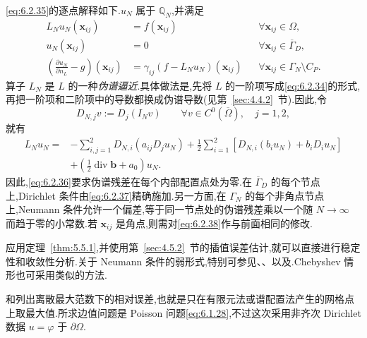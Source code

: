 \eqref{eq:6.2.35}的逐点解释如下.\(u_N\) 属于 \(\mathbb Q_N\),并满足
\begin{align}
  L_Nu_N(\boldsymbol{x}_{ij})&=f(\boldsymbol{x}_{ij})
     &&\forall\boldsymbol{x}_{ij}\in\Omega,\label{eq:6.2.36}\\
  u_N(\boldsymbol{x}_{ij})&=0
     &&\forall\boldsymbol{x}_{ij}\in\overline\Gamma_D,\label{eq:6.2.37}\\
  \left(\frac{\partial u_N}{\partial n_L}-g\right)(\boldsymbol{x}_{ij})
     &=\gamma_{ij}(f-L_Nu_N)(\boldsymbol{x}_{ij})
     &&\forall\boldsymbol{x}_{ij}\in\Gamma_N\setminus C_P.\label{eq:6.2.38}
\end{align}
算子 \(L_N\) 是 \(L\) 的一种\emph{伪谱逼近}.具体做法是,先将 \(L\) 的一阶项写成\eqref{eq:6.2.34}的形式,再把一阶项和二阶项中的导数都换成伪谱导数(见第~\ref{sec:4.4.2}~节).因此,令
\begin{equation}\label{eq:6.2.39}
  D_{N,j}v:=D_j(I_Nv)
    \qquad\forall v\in C^0(\overline\Omega),\quad j=1,2,
\end{equation}
就有
\begin{equation}\label{eq:6.2.40}
  \begin{aligned}
    L_Nu_N={}&-\sum_{i,j=1}^2D_{N,i}(a_{ij}D_ju_N)
       +\frac12\sum_{i=1}^2[D_{N,i}(b_i u_N)+b_iD_i u_N]\\
      &+\left(\frac12\operatorname{div}\boldsymbol{b}+a_0\right)u_N.
  \end{aligned}
\end{equation}
因此,\eqref{eq:6.2.36}要求伪谱残差在每个内部配置点处为零.在 \(\overline\Gamma_D\) 的每个节点上,Dirichlet 条件由\eqref{eq:6.2.37}精确施加.另一方面,在 \(\Gamma_N\) 的每个非角点节点上,Neumann 条件允许一个偏差,等于同一节点处的伪谱残差乘以一个随 \(N\to\infty\) 而趋于零的小常数.若 \(\boldsymbol{x}_{ij}\) 是角点,则需对\eqref{eq:6.2.38}作与前面相同的修改.

应用定理~\ref{thm:5.5.1},并使用第~\ref{sec:4.5.2}~节的插值误差估计,就可以直接进行稳定性和收敛性分析.关于 Neumann 条件的弱形式,特别可参见、、以及.Chebyshev 情形也可采用类似的方法.

和列出离散最大范数下的相对误差,也就是只在有限元法或谱配置法产生的网格点上取最大值.所求边值问题是 Poisson 问题\eqref{eq:6.1.28},不过这次采用非齐次 Dirichlet 数据 \(u=\varphi\) 于 \(\partial\Omega\).


